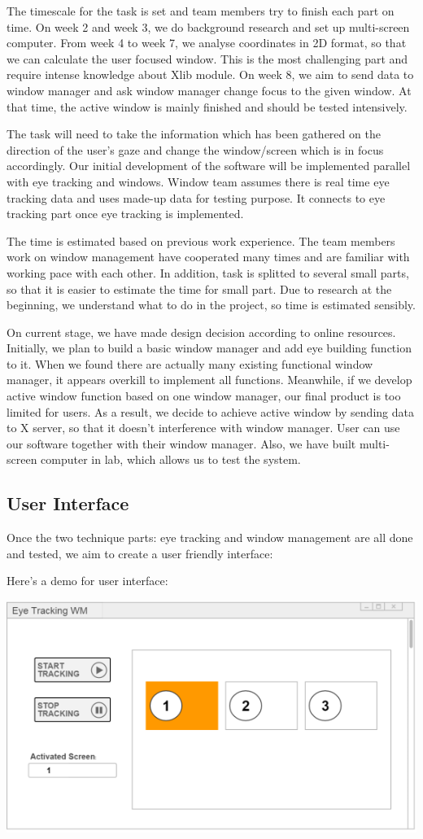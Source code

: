 \documentclass{article}
\begin{document}
The timescale for the task is set and team members try to finish each part on time. On week 2 and week 3, we do background research and set up multi-screen computer. From week 4 to week 7, we analyse coordinates in 2D format, so that we can calculate the user focused window. This is the most challenging part and require intense knowledge about Xlib module. On week 8, we aim to send data to window manager and ask window manager change focus to the given window. At that time, the active window is mainly finished and should be tested intensively.

The task will need to take the information which has been gathered on the direction of the user’s gaze and change the window/screen which is in focus accordingly. Our initial development of the software will be implemented parallel with eye tracking and windows. Window team assumes there is real time eye tracking data and uses made-up data for testing purpose. It connects to eye tracking part once eye tracking is implemented.

The time is estimated based on previous work experience. The team members work on window management have cooperated many times and are familiar with working pace with each other. In addition, task is splitted to several small parts, so that it is easier to estimate the time for small part. Due to research at the beginning, we understand what to do in the project, so time is estimated sensibly.

On current stage, we have made design decision according to online resources. Initially, we plan to build a basic window manager and add eye building function to it. When we found there are actually many existing functional window manager, it appears overkill to implement all functions. Meanwhile, if we develop active window function based on one window manager, our final product is too limited for users. As a result, we decide to achieve active window by sending data to X server, so that it doesn’t interference with window manager. User can use our software together with their window manager. Also, we have built multi-screen computer in lab, which allows us to test the system.

\subsection*{User Interface}
Once the two technique parts: eye tracking and window management are all done and tested, we aim to create a user friendly interface:

Here’s a demo for user interface: \\[1mm]

{\centering
\includegraphics[scale=0.7]{ui.png}\par
}
\end{document}
